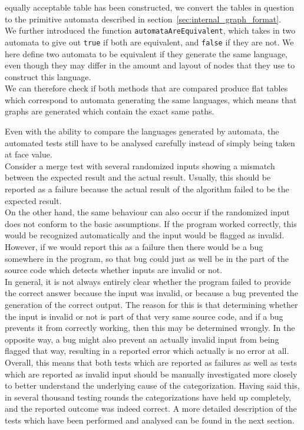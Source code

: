 \documentclass[a4paper,12pt,twoside,BCOR=10mm]{scrbook}
\begin{document}
equally acceptable table has been constructed, we convert the tables in question to the 
primitive automata described in section~\ref{sec:internal_graph_format}. \\
We further introduced the function \texttt{automataAreEquivalent}, which 
takes in two automata to give out \texttt{true} if both are equivalent, 
and \texttt{false} if they are not. We here define two automata to be 
equivalent if they generate the same language, even though they may differ 
in the amount and layout of nodes that they use to construct this language. \\
We can therefore check if both methods that are compared produce flat tables 
which correspond to automata generating the same languages, which means 
that graphs are generated which contain the exact same paths.

Even with the ability to compare the languages generated by automata, 
the automated tests still have to be analysed carefully instead of 
simply being taken at face value. \\
Consider a merge test with several randomized inputs showing a mismatch 
between the expected result and the actual result. 
Usually, this should be reported as a failure because the actual result of the algorithm 
failed to be the expected result. \\
On the other hand, the same behaviour can also occur if the randomized input 
does not conform to the basic assumptions. If the program worked correctly, 
this would be recognized automatically and the input would be flagged as invalid. 
However, if we would report this as a failure then there would be a bug somewhere 
in the program, so that bug could just as well be in the part of the source code 
which detects whether inputs are invalid or not. \\
In general, it is not always entirely clear whether the program failed to provide the correct answer 
because the input was invalid, or because a bug prevented the generation of the correct output. 
The reason for this is that determining whether the input is invalid or not is part of that 
very same source code, and if a bug prevents it from correctly working, then this may be determined 
wrongly. In the opposite way, a bug might also prevent an actually invalid input from being 
flagged that way, resulting in a reported error which actually is no error at all. \\
Overall, this means that both tests which are reported as failures as well as tests which are reported as invalid input 
should be manually investigated more closely to 
better understand the underlying cause of the categorization. 
Having said this, in several thousand testing rounds the categorizations have held up completely, 
and the reported outcome was indeed correct. A more detailed description of the tests which have been performed 
and analysed can be found in the next section.
\end{document}
